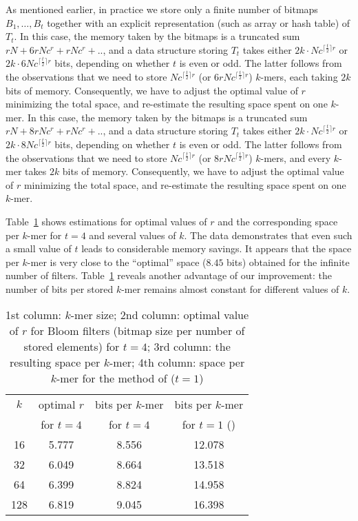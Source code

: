 \documentclass[pdftex]{llncs}\usepackage[T1]{fontenc}
\begin{document}
As mentioned earlier, in practice we store only a finite number of bitmaps $B_1,\ldots,B_t$ together with an explicit representation (such as array or hash table) of $T_t$.  In this case, the memory taken by the bitmaps is a truncated sum $rN + 6rNc^r + rNc^r+ ..$, and a data structure storing $T_t$ takes either $2k \cdot Nc^{\lceil\frac{t}{2}\rceil r}$ or $2k \cdot 6Nc^{\lceil\frac{t}{2}\rceil r}$ bits, depending on whether $t$ is even or odd. The latter follows from the observations that we need to store $Nc^{\lceil\frac{t}{2}\rceil r}$ (or $6rNc^{\lceil\frac{t}{2}\rceil r}$) $k$-mers, each taking $2k$ bits of memory. Consequently, we have to adjust the optimal value of $r$ minimizing the total space, and re-estimate the resulting space spent on one $k$-mer.
In this case, the memory taken by the bitmaps is a truncated sum $rN + 8rNc^r + rNc^r+ ..$, and a data structure storing $T_t$ takes either $2k \cdot Nc^{\lceil\frac{t}{2}\rceil r}$ or $2k \cdot 8Nc^{\lceil\frac{t}{2}\rceil r}$ bits, depending on whether $t$ is even or odd. The latter follows from the observations that we need to store $Nc^{\lceil\frac{t}{2}\rceil r}$ (or $8rNc^{\lceil\frac{t}{2}\rceil r}$) $k$-mers, and every $k$-mer takes $2k$ bits of memory. Consequently, we have to adjust the optimal value of $r$ minimizing the total space, and re-estimate the resulting space spent on one $k$-mer.


Table~\ref{table1} shows estimations for optimal values of $r$ and the corresponding space per $k$-mer for $t=4$ and several values of $k$. The data demonstrates that even such a small value of $t$ leads to considerable memory savings. It appears that the space per $k$-mer is very close to the ``optimal'' space ($8.45$ bits) obtained for the infinite number of filters. Table~\ref{table1} reveals another advantage of our improvement: the number of bits per stored $k$-mer remains almost constant for different values of $k$.

\begin{table}
\begin{center}
\begin{tabular}{|c|c|c|c|}
\hline
$k$ &optimal $r$ & bits per $k$-mer & bits per $k$-mer\\
 & for $t=4$ & for $t=4$ & for $t=1$ (\cite{DBLP:conf/wabi/ChikhiR12}) \\\hline\hline
16 & 5.777 & 8.556& 12.078 \\
\hline
32 & 6.049 & 8.664& 13.518 \\
\hline
64 & 6.399 & 8.824& 14.958 \\
\hline
128 & 6.819 & 9.045& 16.398\\
\hline
\end{tabular}
\end{center}
\caption{1st column: $k$-mer size; 2nd column: optimal value of $r$ for Bloom filters (bitmap size per number of stored elements) for $t=4$; 3rd column: the resulting space per $k$-mer; 4th column: space per $k$-mer for the method of \cite{DBLP:conf/wabi/ChikhiR12} ($t=1$)
}\label{table1}
\end{table}
\end{document}
